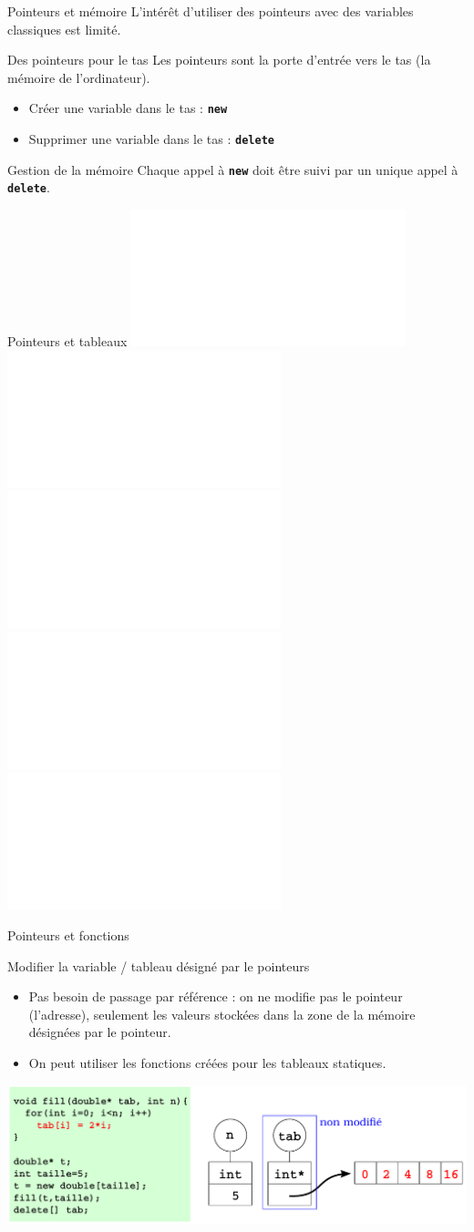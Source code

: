 \begin{frame}{Pointeurs et mémoire}
    L'intérêt d'utiliser des pointeurs avec des variables classiques est limité.

    \begin{block}{Des pointeurs pour le tas}
        Les pointeurs sont la porte d'entrée vers le tas (la mémoire de l'ordinateur).
    \end{block}
    \begin{itemize}
        \item Créer une variable dans le tas : \textbf{\texttt{new}}
        \item Supprimer une variable dans le tas : \textbf{\texttt{delete}}
    \end{itemize}
    
    \begin{alertblock}{Gestion de la mémoire}
    Chaque appel à \textbf{\texttt{new}} doit être suivi par un unique appel à \textbf{\texttt{delete}}.
    \end{alertblock}
\end{frame}

\begin{frame}{Pointeurs et tableaux}
\centering
\includegraphics<1>[width=\linewidth]{images/tableaux_tas_01.pdf}
\includegraphics<2>[width=\linewidth]{images/tableaux_tas_02.pdf}
\includegraphics<3>[width=\linewidth]{images/tableaux_tas_03.pdf}
\includegraphics<4>[width=\linewidth]{images/tableaux_tas_04.pdf}
\includegraphics<5>[width=\linewidth]{images/tableaux_tas_05.pdf}
\end{frame}

\begin{frame}{Pointeurs et fonctions}
\begin{block}{Modifier la variable / tableau désigné par le pointeurs}
    \begin{itemize}
        \item Pas besoin de passage par référence : on ne modifie pas le pointeur (l'adresse), seulement les valeurs stockées dans la zone de la mémoire désignées par le pointeur.
        \item On peut utiliser les fonctions créées pour les tableaux statiques.
    \end{itemize}
\end{block}

\begin{center}
    \vspace{-0.2cm}
    \includegraphics[width=\linewidth]{images/function_ptr_1.pdf}
\end{center}
\end{frame}

